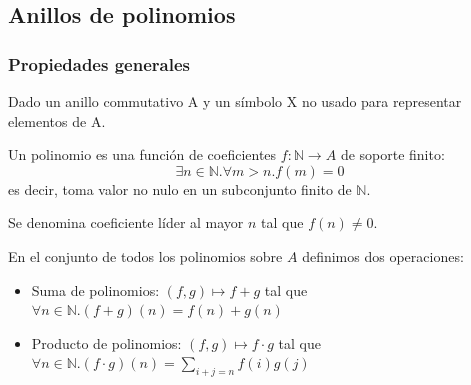 \subsection{Anillos de polinomios}

\subsubsection{Propiedades generales}

\begin{definition}
	Dado un anillo commutativo A y un símbolo X no usado para representar elementos de A. 
	
	Un polinomio es una función de coeficientes $f: \mathbb{N} \to A$ de soporte finito: $$\exists n \in \mathbb{N}. \forall m > n. f(m) = 0$$ es decir, toma valor no nulo en un subconjunto finito de $\mathbb{N}$. 
	
	Se denomina coeficiente líder al mayor $n$ tal que $f(n) \neq 0$. 
	
	En el conjunto de todos los polinomios sobre $A$ definimos dos operaciones:
	
	\begin{itemize}
		\item Suma de polinomios: $(f,g) \mapsto f+g$ tal que $\forall n \in \mathbb{N}.(f+g)(n) = f(n) +g(n)$
		\item Producto de polinomios: $(f,g) \mapsto f \cdot g$ tal que $ \forall n \in \mathbb{N}.(f \cdot g)(n) = \sum_{i+j = n} f(i) g(j)$
	\end{itemize}
\end{definition}

